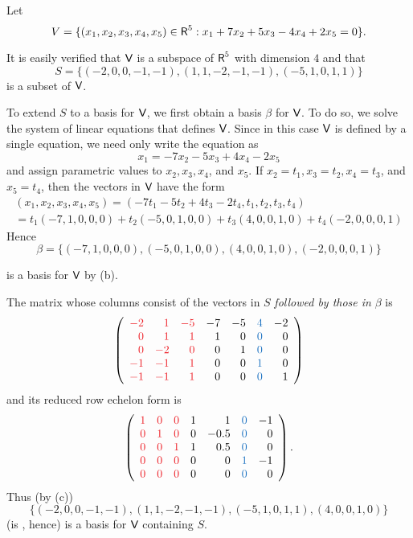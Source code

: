 \begin{example} \label{example 3.4.4}
Let
\[
    V = \{
        (x_1, x_2, x_3, x_4, x_5) \in \textsf{R}^5
        : x_1 + 7x_2 + 5x_3 - 4x_4 + 2x_5 = 0
    \}.
\]

It is easily verified that \(\textsf{V}\) is a subspace of \(\textsf{R}^{5}\) with dimension \(4\) and that
\[
    S = \{(-2,0,0,-1,-1),(1,1,-2,-1,-1),(-5,1,0,1,1)\}
\]
is a \LID{} subset of \(\textsf{V}\).

To extend \(S\) to a basis for \(\textsf{V}\), we first obtain a basis  \(\beta\) for \(\textsf{V}\).
To do so, we solve the system of linear equations that defines \(\textsf{V}\).
Since in this case \(\textsf{V}\) is defined by a single equation, we need only write the equation as
\[
    x_1 = -7 x_2 - 5 x_3 + 4 x_4 - 2 x_5
\]
and assign parametric values to \(x_2, x_3, x_4\), and \(x_5\).
If \(x_2 = t_1, x_3 = t_2, x_4 = t_3\), and \(x_5 = t_4\), then the vectors in \(\textsf{V}\) have the form
\[
\begin{array}{l}
    (x_1, x_2, x_3, x_4, x_5) = (-7 t_1 - 5 t_2 + 4 t_3 - 2 t_4, t_1, t_2, t_3, t_4) \\
    = t_1(-7,1,0,0,0) + t_2(-5,0,1,0,0) + t_3(4,0,0,1,0) + t_4(-2,0,0,0,1)
\end{array}
\]
Hence
\[
    \beta = \{(-7,1,0,0,0),(-5,0,1,0,0),(4,0,0,1,0),(-2,0,0,0,1)\}
\]

is a basis for \(\textsf{V}\) by (b).

The matrix whose columns consist of the vectors in \(S\) \emph{followed by those in} \(\beta\) is
\[
    \left(\begin{array}{rrrrrrr}
        \RED{-2} & \RED{1}  & \RED{-5} & -7 & -5 & \BLUE{4} & -2 \\
        \RED{0}  & \RED{1}  & \RED{1}  &  1 &  0 & \BLUE{0} & 0 \\
        \RED{0}  & \RED{-2} & \RED{0}  &  0 &  1 & \BLUE{0} & 0 \\
        \RED{-1} & \RED{-1} & \RED{1}  &  0 &  0 & \BLUE{1} & 0 \\
        \RED{-1} & \RED{-1} & \RED{1}  &  0 &  0 & \BLUE{0} & 1
    \end{array}\right)
\]
and its reduced row echelon form is
\[
    \left(\begin{array}{llllrlr}
        \RED{1} & \RED{0} & \RED{0} & 1 &    1 & \BLUE{0} & -1 \\
        \RED{0} & \RED{1} & \RED{0} & 0 & -0.5 & \BLUE{0} & 0 \\
        \RED{0} & \RED{0} & \RED{1} & 1 &  0.5 & \BLUE{0} & 0 \\
        \RED{0} & \RED{0} & \RED{0} & 0 &    0 & \BLUE{1} & -1 \\
        \RED{0} & \RED{0} & \RED{0} & 0 &    0 & \BLUE{0} & 0
\end{array}\right).
\]
Thus (by (c))
\[
    \{(-2,0,0,-1,-1),(1,1,-2,-1,-1),(-5,1,0,1,1),(4,0,0,1,0)\}
\]
(is \LID{}, hence) is a basis for \(\textsf{V}\) containing \(S\).
\end{example}
